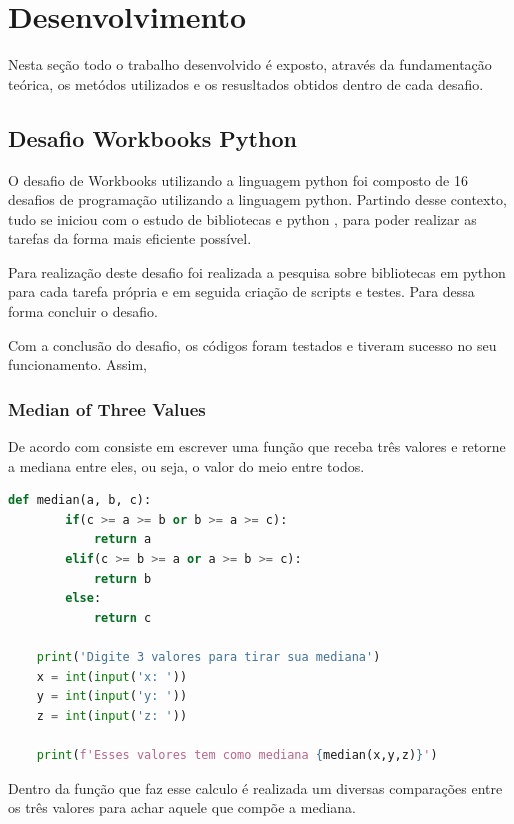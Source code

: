 \chapter{Desenvolvimento}
\label{chap:desenv}

Nesta seção todo o trabalho desenvolvido é exposto, através da fundamentação teórica, os metódos utilizados e os resusltados obtidos dentro de cada desafio.

\section{Desafio Workbooks Python}

O desafio de Workbooks utilizando a linguagem python foi composto de 16 desafios de programação utilizando a linguagem python. Partindo desse contexto, tudo se iniciou com o estudo de bibliotecas e python \cite{CursoPyt77:online}, para poder realizar as tarefas da forma mais eficiente possível.

Para realização deste desafio foi realizada a pesquisa sobre bibliotecas em python para cada tarefa própria e em seguida criação de scripts e testes. Para dessa forma concluir o desafio.

Com a conclusão do desafio, os códigos foram testados e tiveram sucesso no seu funcionamento. Assim,

\subsection{Median of Three Values}

De acordo com  consiste em escrever uma função que receba três valores e retorne a mediana entre eles, ou seja, o valor do meio entre todos.

\begin{lstlisting}[language=Python]
    def median(a, b, c):
        if(c >= a >= b or b >= a >= c):
            return a
        elif(c >= b >= a or a >= b >= c):
            return b
        else:
            return c

    print('Digite 3 valores para tirar sua mediana')
    x = int(input('x: '))
    y = int(input('y: '))
    z = int(input('z: '))

    print(f'Esses valores tem como mediana {median(x,y,z)}')

\end{lstlisting}

Dentro da função que faz esse calculo é realizada um diversas comparações entre os três valores para achar aquele que compõe a mediana.

